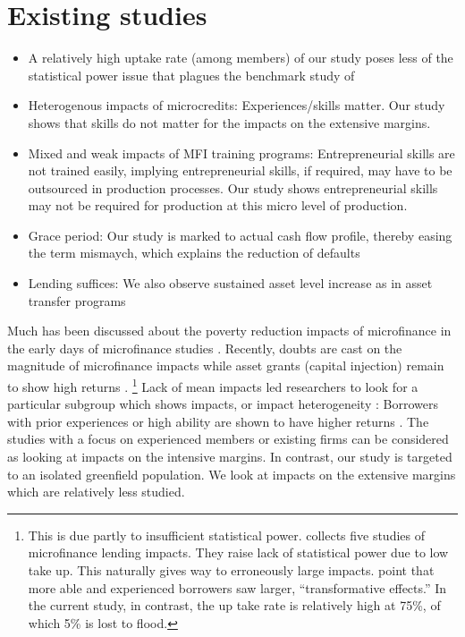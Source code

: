 \section{Existing studies}
\label{SecExistingStudies}

\begin{mdframed}[style={SecItemize}, frametitle={Existing studies}]
\begin{itemize}
\vspace{1.0ex}\setlength{\itemsep}{1.0ex}\setlength{\baselineskip}{12pt}
\item	A relatively high uptake rate (among members) of our study poses less of the statistical power issue that plagues the benchmark study of \citet{BanerjeeKarlanZinman2015}
\item	Heterogenous impacts of microcredits: Experiences/skills matter. Our study shows that skills do not matter for the impacts on the extensive margins.
\item	Mixed and weak impacts of MFI training programs: Entrepreneurial skills are not trained easily, implying entrepreneurial skills, if required, may have to be outsourced in production processes. Our study shows entrepreneurial skills may not be required for production at this micro level of production.
\item	Grace period: Our study is marked to actual cash flow profile, thereby easing the term mismaych, which explains the reduction of defaults
\item	Lending suffices: We also observe sustained asset level increase as in asset transfer programs
\end{itemize}
\end{mdframed}

	Much has been discussed about the poverty reduction impacts of microfinance in the early days of microfinance studies \citep{Morduch1999}. Recently, doubts are cast on the magnitude of microfinance impacts \citep{BanerjeeKarlanZinman2015, DuvendackMader2019, Meager2019} while asset grants (capital injection) remain to show high returns \citep{deMel2008, DeMel2014, FafchampsFlypaper2014, BandieraBRAC2017}. \footnote{This is due partly to insufficient statistical power.\citet{BanerjeeKarlanZinman2015} collects five studies of microfinance lending impacts. They raise lack of statistical power due to low take up. This naturally gives way to erroneously large impacts. \citet{BanerjeeKarlanZinman2015} point that more able and experienced borrowers saw larger, ``transformative effects.'' In the current study, in contrast, the up take rate is relatively high at 75\%, of which 5\% is lost to flood.  } Lack of mean impacts led researchers to look for a particular subgroup which shows impacts, or impact heterogeneity \citep{Banerjee2017HyderabadFollowup}: Borrowers with prior experiences or high ability are shown to have higher returns \citep{Banerjee2015Miracle, Mckenzie2017Spurring, Buera2017}. The studies with a focus on experienced members or existing firms can be considered as looking at impacts on the intensive margins. In contrast, our study is targeted to an isolated greenfield population. We look at impacts on the extensive margins which are relatively less studied.

